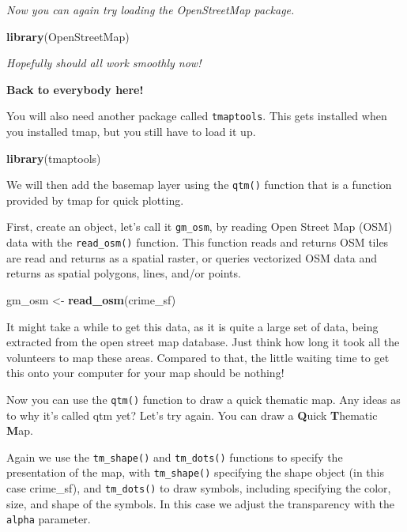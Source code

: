 \documentclass[]{book}
\newenvironment{Shaded}{\begin{snugshade}}{\end{snugshade}}
\newcommand{\KeywordTok}[1]{\textcolor[rgb]{0.13,0.29,0.53}{\textbf{#1}}}
\newcommand{\NormalTok}[1]{#1}
\newcommand{\StringTok}[1]{\textcolor[rgb]{0.31,0.60,0.02}{#1}}
\begin{document}
\emph{Now you can again try loading the OpenStreetMap package.}

\begin{Shaded}
\begin{Highlighting}[]
\KeywordTok{library}\NormalTok{(OpenStreetMap)}
\end{Highlighting}
\end{Shaded}

\emph{Hopefully should all work smoothly now!}

\textbf{Back to everybody here!}

You will also need another package called \texttt{tmaptools}. This gets installed when you installed tmap, but you still have to load it up.

\begin{Shaded}
\begin{Highlighting}[]
\KeywordTok{library}\NormalTok{(tmaptools)}
\end{Highlighting}
\end{Shaded}

We will then add the basemap layer using the \texttt{qtm()} function that is a function provided by tmap for quick plotting.

First, create an object, let's call it \texttt{gm\_osm}, by reading Open Street Map (OSM) data with the \texttt{read\_osm()} function. This function reads and returns OSM tiles are read and returns as a spatial raster, or queries vectorized OSM data and returns as spatial polygons, lines, and/or points.

\begin{Shaded}
\begin{Highlighting}[]
\NormalTok{gm_osm <-}\StringTok{ }\KeywordTok{read_osm}\NormalTok{(crime_sf)}
\end{Highlighting}
\end{Shaded}

It might take a while to get this data, as it is quite a large set of data, being extracted from the open street map database. Just think how long it took all the volunteers to map these areas. Compared to that, the little waiting time to get this onto your computer for your map should be nothing!

Now you can use the \texttt{qtm()} function to draw a quick thematic map. Any ideas as to why it's called qtm yet? Let's try again. You can draw a \textbf{Q}uick \textbf{T}hematic \textbf{M}ap.

Again we use the \texttt{tm\_shape()} and \texttt{tm\_dots()} functions to specify the presentation of the map, with \texttt{tm\_shape()} specifying the shape object (in this case crime\_sf), and \texttt{tm\_dots()} to draw symbols, including specifying the color, size, and shape of the symbols. In this case we adjust the transparency with the \texttt{alpha} parameter.
\end{document}
